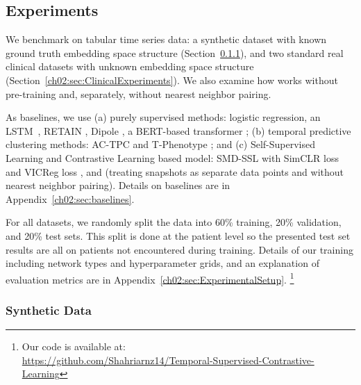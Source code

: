 \subsection{Experiments}

We benchmark  on tabular time series data:
a synthetic dataset with known ground truth embedding space structure (Section~\ref{ch02:sec:ToyExperiment}), and two standard real clinical datasets with unknown embedding space structure (Section~\ref{ch02:sec:ClinicalExperiments}). %
We also examine how  works without pre-training and, separately, without nearest neighbor pairing.

As baselines, we use (a) purely supervised methods: logistic regression, an LSTM~\citep{hochreiter1997long}, \mbox{RETAIN} \citep{choi2016retain}, Dipole \citep{ma2017dipole}, a BERT-based transformer \citep{devlin2018bert}; (b) temporal predictive clustering methods: AC-TPC \citep{lee2020temporal} and T-Phenotype \citep{qin2023t}; and (c) Self-Supervised Learning and Contrastive Learning based model: SMD-SSL \citep{raghu2023sequential} with SimCLR loss \citep{chen2020simple} and VICReg loss \citep{bardes2021vicreg}, and \mbox{} (treating snapshots as separate data points and without nearest neighbor pairing).
Details on baselines are in Appendix~\ref{ch02:sec:baselines}.

For all datasets, we randomly split the data into 60\% training, 20\% validation, and 20\% test sets. 
This split is done at the patient level so the presented test set results are all on patients not encountered during training.
Details of our training including network types and hyperparameter grids, and an explanation of evaluation metrics are in Appendix~\ref{ch02:sec:ExperimentalSetup}.
\footnote{Our code is available at: \\ \url{https://github.com/Shahriarnz14/Temporal-Supervised-Contrastive-Learning}}

   
\subsubsection{Synthetic Data}





 
\label{ch02:sec:ToyExperiment}


